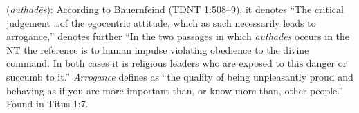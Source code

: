 \item[Arrogant,]

(\textit{authadēs}):
According to Bauernfeind (TDNT 1:508--9), it denotes ``The critical judgement \ldots of the egocentric attitude, which as such necessarily leads to arrogance,'' denotes further ``In the two passages in which \emph{authades} occurs in the NT the reference is to human impulse violating obedience to the divine command. In both cases it is religious leaders who are exposed to this danger or succumb to it.'' \emph{Arrogance} defines as ``the quality of being unpleasantly proud and behaving as if you are more important than, or know more than, other people.'' 
Found in Titus 1:7.
